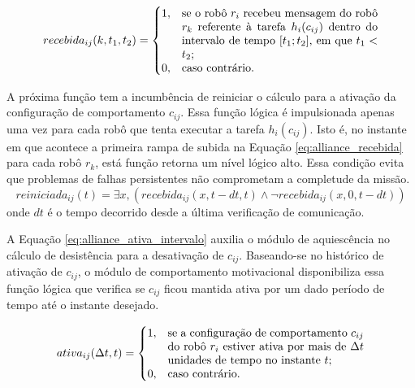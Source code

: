     \begin{equation} \label{eq:alliance_recebida}
        recebida_{ij}(k, t_1, t_2) =
        \begin{cases}
            1, & \parbox[t]{.5\textwidth}{se o robô $r_i$ recebeu mensagem do robô $r_k$ referente à tarefa $h_i(c_{ij})$ dentro do intervalo de tempo $[t_1; t_2]$, em que $t_1 < t_2$;} \\
            0, & \text{caso contrário.}
        \end{cases}
    \end{equation}
    
    A próxima função tem a incumbência de reiniciar o cálculo para a ativação da configuração de comportamento $c_{ij}$. Essa função lógica é impulsionada apenas uma vez para cada robô que tenta executar a tarefa $h_i(c_{ij})$. Isto é, no instante em que acontece a primeira rampa de subida na Equação \ref{eq:alliance_recebida} para cada robô $r_k$, está função retorna um nível lógico alto. Essa condição evita que problemas de falhas persistentes não comprometam a completude da missão.
    \begin{equation} \label{eq:alliance_reiniciada}
        reiniciada_{ij}(t) = \exists x, (recebida_{ij}(x, t - dt, t) \land \lnot recebida_{ij}(x, 0, t - dt))
    \end{equation}
    onde $dt$ é o tempo decorrido desde a última verificação de comunicação.
    
    A Equação \ref{eq:alliance_ativa_intervalo} auxilia o módulo de aquiescência no cálculo de desistência para a desativação de $c_{ij}$. Baseando-se no histórico de ativação de $c_{ij}$, o módulo de comportamento motivacional disponibiliza essa função lógica que verifica se $c_{ij}$ ficou mantida ativa por um dado período de tempo até o instante desejado.
    
    \begin{equation} \label{eq:alliance_ativa_intervalo}
        ativa_{ij}(\Delta t, t) =
        \begin{cases}
            1, & \parbox[t]{.5\textwidth}{se a configuração de comportamento $c_{ij}$ do robô $r_i$ estiver ativa por mais de $\Delta t$ unidades de tempo no instante $t$;} \\
            0, & \text{caso contrário.}
        \end{cases}
    \end{equation}
    
